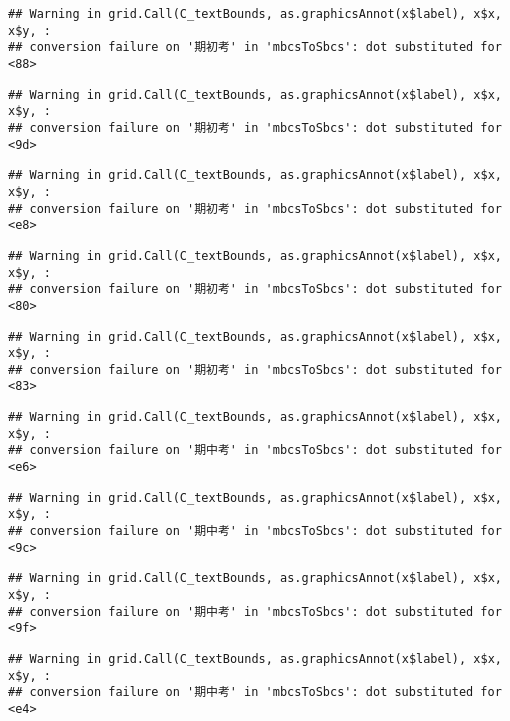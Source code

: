 \documentclass[
]{book}
\begin{document}
\begin{verbatim}
## Warning in grid.Call(C_textBounds, as.graphicsAnnot(x$label), x$x, x$y, :
## conversion failure on '期初考' in 'mbcsToSbcs': dot substituted for <88>
\end{verbatim}

\begin{verbatim}
## Warning in grid.Call(C_textBounds, as.graphicsAnnot(x$label), x$x, x$y, :
## conversion failure on '期初考' in 'mbcsToSbcs': dot substituted for <9d>
\end{verbatim}

\begin{verbatim}
## Warning in grid.Call(C_textBounds, as.graphicsAnnot(x$label), x$x, x$y, :
## conversion failure on '期初考' in 'mbcsToSbcs': dot substituted for <e8>
\end{verbatim}

\begin{verbatim}
## Warning in grid.Call(C_textBounds, as.graphicsAnnot(x$label), x$x, x$y, :
## conversion failure on '期初考' in 'mbcsToSbcs': dot substituted for <80>
\end{verbatim}

\begin{verbatim}
## Warning in grid.Call(C_textBounds, as.graphicsAnnot(x$label), x$x, x$y, :
## conversion failure on '期初考' in 'mbcsToSbcs': dot substituted for <83>
\end{verbatim}

\begin{verbatim}
## Warning in grid.Call(C_textBounds, as.graphicsAnnot(x$label), x$x, x$y, :
## conversion failure on '期中考' in 'mbcsToSbcs': dot substituted for <e6>
\end{verbatim}

\begin{verbatim}
## Warning in grid.Call(C_textBounds, as.graphicsAnnot(x$label), x$x, x$y, :
## conversion failure on '期中考' in 'mbcsToSbcs': dot substituted for <9c>
\end{verbatim}

\begin{verbatim}
## Warning in grid.Call(C_textBounds, as.graphicsAnnot(x$label), x$x, x$y, :
## conversion failure on '期中考' in 'mbcsToSbcs': dot substituted for <9f>
\end{verbatim}

\begin{verbatim}
## Warning in grid.Call(C_textBounds, as.graphicsAnnot(x$label), x$x, x$y, :
## conversion failure on '期中考' in 'mbcsToSbcs': dot substituted for <e4>
\end{verbatim}
\end{document}
